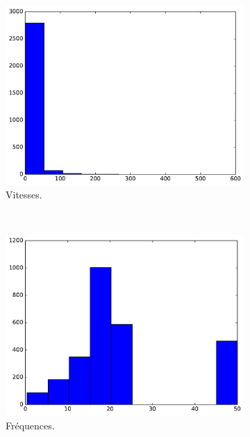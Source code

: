 	\begin{figure}[!htbp]	
		\begin{subfigure}[t]{\subImgWclicks}
			\centering
			\includegraphics[width=\textwidth]{figures/ch3/bille_filteredSpeed}
			\caption{Vitesses.}
			\label{fig:bille_filteredSpeed}
		\end{subfigure}
		~
		\begin{subfigure}[t]{\subImgWclicks}
			\centering
			\includegraphics[width=\textwidth]{figures/ch3/bille_frequency}
			\caption{Fréquences.}
			\label{fig:bille_frequency}
		\end{subfigure}
		~
		\begin{subfigure}[t]{\subImgWclicks}
			\centering

\end{subfigure}
\end{figure}
